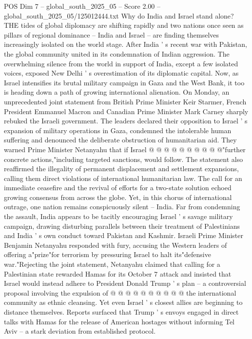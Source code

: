\begin{textsample}{POS Dim 7 – global\_south\_2025\_05 – Score 2.00 – global\_south\_2025\_05/125012444.txt}  \label{ex:f7_pos_231}
Why do India and Israel stand alone?
THE tides of global diplomacy are shifting rapidly and two nations once seen as pillars of regional dominance -- India and Israel -- are finding themselves increasingly isolated on the world stage.
After India ' s recent war with Pakistan, the global community united in its condemnation of Indian aggression.
The overwhelming silence from the world in support of India, except a few isolated voices, exposed New Delhi ' s overestimation of its diplomatic capital.
Now, as Israel intensifies its brutal military campaign in Gaza and the West Bank, it too is heading down a path of growing international alienation.
On Monday, an unprecedented joint statement from British Prime Minister Keir Starmer, French President Emmanuel Macron and Canadian Prime Minister Mark Carney sharply rebuked the Israeli government.
The leaders declared their opposition to Israel ' s expansion of military operations in Gaza, condemned the intolerable human suffering and denounced the deliberate obstruction of humanitarian aid.
They warned Prime Minister Netanyahu that if Israel @ @ @ @ @ @ @ @ @ @"further concrete actions,"including targeted sanctions, would follow.
The statement also reaffirmed the illegality of permanent displacement and settlement expansions, calling them direct violations of international humanitarian law.
The call for an immediate ceasefire and the revival of efforts for a two-state solution echoed growing consensus from across the globe.
Yet, in this chorus of international outrage, one nation remains conspicuously silent -- India.
Far from condemning the assault, India appears to be tacitly encouraging Israel ' s savage military campaign, drawing disturbing parallels between their treatment of Palestinians and India ' s own conduct toward Pakistan and Kashmir.
Israeli Prime Minister Benjamin Netanyahu responded with fury, accusing the Western leaders of offering a"prize"for terrorism by pressuring Israel to halt its"defensive war."Rejecting the joint statement, Netanyahu claimed that calling for a Palestinian state rewarded Hamas for its October 7 attack and insisted that Israel would instead adhere to President Donald Trump ' s plan -- a controversial proposal involving the expulsion of @ @ @ @ @ @ @ @ @ @ the international community as ethnic cleansing.
Yet even Israel ' s closest allies are beginning to distance themselves.
Reports surfaced that Trump ' s envoys engaged in direct talks with Hamas for the release of American hostages without informing Tel Aviv -- a stark deviation from established protocol.

\end{textsample}
